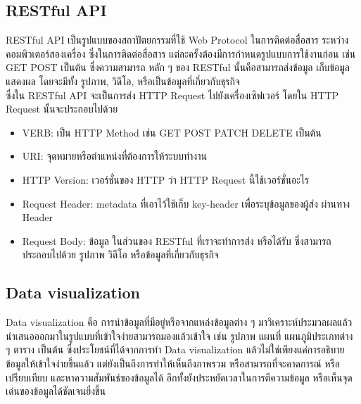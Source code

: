 \documentclass[12pt,oneside,openright,a4paper]{cpe-thai-project}
\begin{document}

\subsection{RESTful API}
\hspace*{1cm}RESTful API \cite{WhatIsRESTful} เป็นรูปแบบของสถาปัตยกรรมที่ใช้ Web Protocol ในการติดต่อสื่อสาร ระหว่างคอมพิวเตอร์สองเครื่อง ซึ่งในการติดต่อสื่อสาร แต่ละครั้งต้องมีการกำหนดรูปแบบการใช้งานก่อน เช่น GET POST เป็นต้น ซึ่งความสามารถ หลัก ๆ ของ RESTful นั้นคือสามารถส่งข้อมูล เก็บข้อมูล แสดงผล โดยจะมีทั้ง รูปภาพ, วิดีโอ, หรือเป็นข้อมูลที่เกี่ยวกับธุรกิจ\\
\hspace*{1cm}ซึ่งใน RESTful API จะเป็นการส่ง HTTP Request ไปยังเครื่องเซิฟเวอร์ โดยใน HTTP Request นั้นจะประกอบไปด้วย
\begin{itemize}
  \item {VERB: เป็น HTTP Method เช่น GET POST PATCH DELETE เป็นต้น}
  \item {URI: จุดหมายหรือตำแหน่งที่ต้องการให้ระบบทำงาน}
  \item {HTTP Version: เวอร์ชั่นของ HTTP ว่า HTTP Request นี้ใช้เวอร์ชั่นอะไร}
  \item {Request Header: metadata ที่เอาไว้ใช้เก็บ key-header เพื่อระบุข้อมูลของผู้ส่ง ผ่านทาง Header}
  \item {Request Body: ข้อมูล ในส่วนของ RESTful ที่เราจะทำการส่ง หรือได้รับ ซึ่งสามารถประกอบไปด้วย รูปภาพ วิดีโอ หรือข้อมูลที่เกี่ยวกับธุรกิจ}  
\end{itemize}

\subsection{Data visualization}
\hspace*{1cm} Data visualization \cite{WhatIsDataVisualization} คือ การนำข้อมูลที่มีอยู่หรือจากแหล่งข้อมูลต่าง ๆ มาวิเคราะห์ประมวลผลแล้วนำเสนอออกมาในรูปแบบที่เข้าใจง่ายสามารถมองแล้วเข้าใจ เช่น รูปภาพ แผนที่ แผนภูมิประเภทต่าง ๆ ตาราง เป็นต้น ซึ่งประโยชน์ที่ได้จากการทำ Data visualization แล้วไม่ใช่เพียงแค่การอธิบายข้อมูลให้เข้าใจง่ายขึ้นแล้ว แต่ยังเป็นถึงการทำให้เห็นถึงภาพรวม หรือสามารถที่จะคาดการณ์ หรือเปรียบเทียบ และหาความสัมพันธ์ของข้อมูลได้ อีกทั้งยังประหยัดเวลาในการตีความข้อมูล หรือเห็นจุดเด่นของข้อมูลได้ชัดเจนยิ่งขึ้น 
\end{document}
